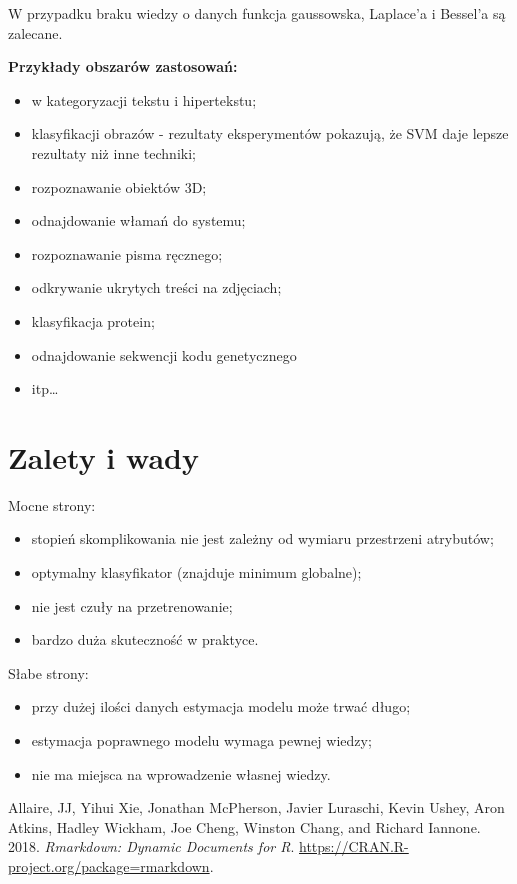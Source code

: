 \documentclass[
]{book}
\providecommand{\tightlist}{%
  \setlength{\itemsep}{0pt}\setlength{\parskip}{0pt}}
\theoremstyle{plain}
\theoremstyle{definition}
\theoremstyle{definition}
\theoremstyle{definition}
\theoremstyle{definition}
\theoremstyle{remark}
\begin{document}
W przypadku braku wiedzy o danych funkcja gaussowska, Laplace'a i Bessel'a są zalecane.

\textbf{Przykłady obszarów zastosowań:}

\begin{itemize}
\tightlist
\item
  w kategoryzacji tekstu i hipertekstu;
\item
  klasyfikacji obrazów - rezultaty eksperymentów pokazują, że SVM daje lepsze rezultaty niż inne techniki;
\item
  rozpoznawanie obiektów 3D;
\item
  odnajdowanie włamań do systemu;
\item
  rozpoznawanie pisma ręcznego;
\item
  odkrywanie ukrytych treści na zdjęciach;
\item
  klasyfikacja protein;
\item
  odnajdowanie sekwencji kodu genetycznego
\item
  itp\ldots{}
\end{itemize}

\hypertarget{zalety-i-wady-2}{%
\section{Zalety i wady}\label{zalety-i-wady-2}}

Mocne strony:

\begin{itemize}
\tightlist
\item
  stopień skomplikowania nie jest zależny od wymiaru przestrzeni atrybutów;
\item
  optymalny klasyfikator (znajduje minimum globalne);
\item
  nie jest czuły na przetrenowanie;
\item
  bardzo duża skuteczność w praktyce.
\end{itemize}

Słabe strony:

\begin{itemize}
\tightlist
\item
  przy dużej ilości danych estymacja modelu może trwać długo;
\item
  estymacja poprawnego modelu wymaga pewnej wiedzy;
\item
  nie ma miejsca na wprowadzenie własnej wiedzy.
\end{itemize}

\hypertarget{refs}{}
\leavevmode\hypertarget{ref-R-rmarkdown}{}%
Allaire, JJ, Yihui Xie, Jonathan McPherson, Javier Luraschi, Kevin Ushey, Aron Atkins, Hadley Wickham, Joe Cheng, Winston Chang, and Richard Iannone. 2018. \emph{Rmarkdown: Dynamic Documents for R}. \url{https://CRAN.R-project.org/package=rmarkdown}.
\end{document}

